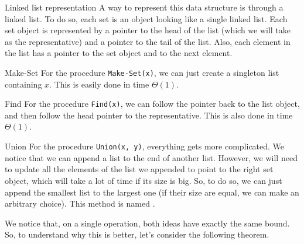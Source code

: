 \documentclass[a4paper]{article}
\begin{document}
\begin{parag}{Linked list representation}
    A way to represent this data structure is through a linked list. To do so, each set is an object looking like a single linked list. Each set object is represented by a pointer to the head of the list (which we will take as the representative) and a pointer to the tail of the list. Also, each element in the list has a pointer to the set object and to the next element.


    \begin{subparag}{Make-Set}
        For the procedure \texttt{Make-Set(x)}, we can just create a singleton list containing $x$. This is easily done in time $\Theta\left(1\right)$.
    \end{subparag}

    \begin{subparag}{Find}
        For the procedure \texttt{Find(x)}, we can follow the pointer back to the list object, and then follow the head pointer to the representative. This is also done in time $\Theta\left(1\right)$.
    \end{subparag}
    
    \begin{subparag}{Union}
        For the procedure \texttt{Union(x, y)}, everything gets more complicated. We notice that we can append a list to the end of another list. However, we will need to update all the elements of the list we appended to point to the right set object, which will take a lot of time if its size is big. So, to do so, we can just append the smallest list to the largest one (if their size are equal, we can make an arbitrary choice). This method is named .

        We notice that, on a single operation, both ideas have exactly the same bound. So, to understand why this is better, let's consider the following theorem.
    \end{subparag}
\end{parag}
\end{document}
